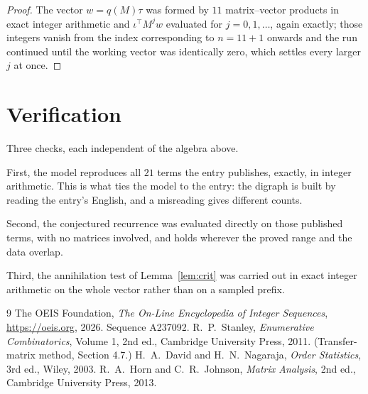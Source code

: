 \documentclass[11pt,a4paper]{article}
\theoremstyle{plain}
\theoremstyle{definition}
\begin{document}
\begin{proof}
The vector $w=q(M)\tau$ was formed by $11$ matrix--vector products in exact integer
arithmetic and $\iota^{\!\top}M^{j}w$ evaluated for $j=0,1,\dots$, again exactly; those
integers vanish from the index corresponding to $n=11+1$ onwards and the run continued
until the working vector was identically zero, which settles every larger $j$ at once.
\end{proof}

\section{Verification}

Three checks, each independent of the algebra above.

First, the model reproduces all $21$ terms the entry publishes, exactly, in integer
arithmetic. This is what ties the model to the entry: the digraph is built by reading the
entry's English, and a misreading gives different counts.

Second, the conjectured recurrence was evaluated directly on those published terms, with no
matrices involved, and holds wherever the proved range and the data overlap.

Third, the annihilation test of Lemma~\ref{lem:crit} was carried out in exact integer
arithmetic on the whole vector rather than on a sampled prefix.

\begin{thebibliography}{9}
 The OEIS Foundation, \emph{The On-Line Encyclopedia of Integer
Sequences}, \url{https://oeis.org}, 2026. Sequence A237092.
 R.~P.~Stanley, \emph{Enumerative Combinatorics}, Volume 1, 2nd ed.,
Cambridge University Press, 2011. (Transfer-matrix method, Section 4.7.)
 H.~A.~David and H.~N.~Nagaraja, \emph{Order Statistics}, 3rd ed., Wiley,
2003.
 R.~A.~Horn and C.~R.~Johnson, \emph{Matrix Analysis}, 2nd ed., Cambridge
University Press, 2013.
\end{thebibliography}
\end{document}
